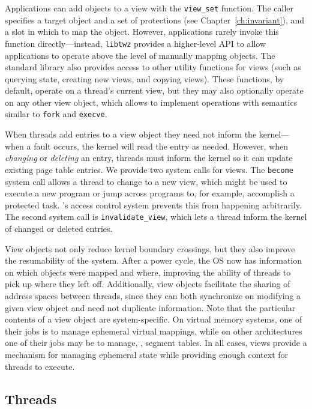 Applications can add objects to a view with the \texttt{view\_set} function. The caller specifies a
target object and a set of protections (see Chapter~\ref{ch:invariant}), and a slot in which to
map the object. However, applications rarely invoke this function directly---instead,
\texttt{libtwz} provides a higher-level API to allow applications to operate above the level of
manually mapping objects. The standard library also provides access to other utility functions for
views (such as querying state, creating new views, and copying views). These functions, by default,
operate on a thread's current view, but they may also optionally operate on any other view object,
which allows \Twizzler to implement operations with semantics similar to \texttt{fork} and \texttt{execve}.

When threads add entries to a view object they need not inform the kernel---when
a fault occurs, the kernel will read the entry as needed. However, when \emph{changing} or
\emph{deleting} an entry, threads must inform the kernel so it can update existing page table entries.
We provide two system calls for views. The \texttt{become} system call allows a thread to
change to a new view, which might be used to execute a new program or jump across programs to, for
example, accomplish a protected task. \Twizzler's access control system prevents this from happening
arbitrarily. The second system call is \texttt{invalidate\_view}, which lets a thread inform the
kernel of changed or deleted entries.

View objects not only reduce kernel boundary crossings, but they also improve the resumability of
the system. After a power cycle, the OS now has information on which objects were mapped and where,
improving the ability of threads to pick up where they left off. Additionally, view objects
facilitate the sharing of address spaces between threads, since they can both synchronize on
modifying a given view object and need not duplicate information. Note that the particular contents
of a view object are system-specific. On virtual memory systems, one of their jobs is to manage
ephemeral virtual mappings, while on other architectures one of their jobs may be to manage, \eg, segment
tables. In all cases, views provide a mechanism for managing ephemeral state while
providing enough context for threads to execute.

\subsection{Threads}

